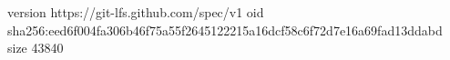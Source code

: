 version https://git-lfs.github.com/spec/v1
oid sha256:eed6f004fa306b46f75a55f2645122215a16dcf58c6f72d7e16a69fad13ddabd
size 43840

